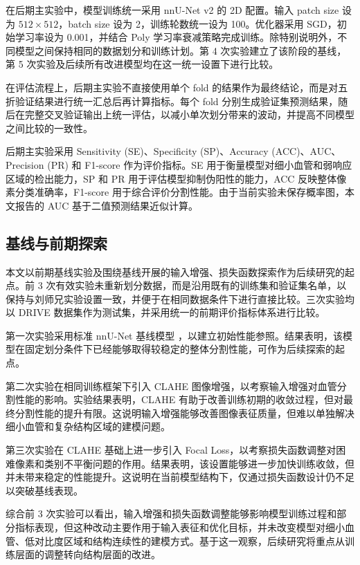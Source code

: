 \documentclass[a4paper,12pt]{article}
\begin{document}
在后期主实验中，模型训练统一采用 nnU-Net v2 的 2D 配置。输入 patch size 设为 \(512 \times 512\)，batch size 设为 2，训练轮数统一设为 100。优化器采用 SGD，初始学习率设为 0.001，并结合 Poly 学习率衰减策略完成训练。除特别说明外，不同模型之间保持相同的数据划分和训练计划。第 4 次实验建立了该阶段的基线，第 5 次实验及后续所有改进模型均在这一统一设置下进行比较。

在评估流程上，后期主实验不直接使用单个 fold 的结果作为最终结论，而是对五折验证结果进行统一汇总后再计算指标。每个 fold 分别生成验证集预测结果，随后在完整交叉验证输出上统一评估，以减小单次划分带来的波动，并提高不同模型之间比较的一致性。

后期主实验采用 Sensitivity (SE)、Specificity (SP)、Accuracy (ACC)、AUC、Precision (PR) 和 F1-score 作为评价指标。SE 用于衡量模型对细小血管和弱响应区域的检出能力，SP 和 PR 用于评估模型抑制伪阳性的能力，ACC 反映整体像素分类准确率，F1-score 用于综合评价分割性能。由于当前实验未保存概率图，本文报告的 AUC 基于二值预测结果近似计算。

\subsection{基线与前期探索}

本文以前期基线实验及围绕基线开展的输入增强、损失函数探索作为后续研究的起点。前 3 次有效实验未重新划分数据，而是沿用既有的训练集和验证集名单，以保持与刘师兄实验设置一致，并便于在相同数据条件下进行直接比较。三次实验均以 DRIVE 数据集作为测试集，并采用统一的前期评价指标体系进行比较。

第一次实验采用标准 nnU-Net 基线模型 \cite{isensee2021nnunet}，以建立初始性能参照。结果表明，该模型在固定划分条件下已经能够取得较稳定的整体分割性能，可作为后续探索的起点。

第二次实验在相同训练框架下引入 CLAHE 图像增强，以考察输入增强对血管分割性能的影响。实验结果表明，CLAHE 有助于改善训练初期的收敛过程，但对最终分割性能的提升有限。这说明输入增强能够改善图像表征质量，但难以单独解决细小血管和复杂结构区域的建模问题。

第三次实验在 CLAHE 基础上进一步引入 Focal Loss，以考察损失函数调整对困难像素和类别不平衡问题的作用。结果表明，该设置能够进一步加快训练收敛，但并未带来稳定的性能提升。这说明在当前模型结构下，仅通过损失函数设计仍不足以突破基线表现。

综合前 3 次实验可以看出，输入增强和损失函数调整能够影响模型训练过程和部分指标表现，但这种改动主要作用于输入表征和优化目标，并未改变模型对细小血管、低对比度区域和结构连续性的建模方式。基于这一观察，后续研究将重点从训练层面的调整转向结构层面的改进。
\end{document}
